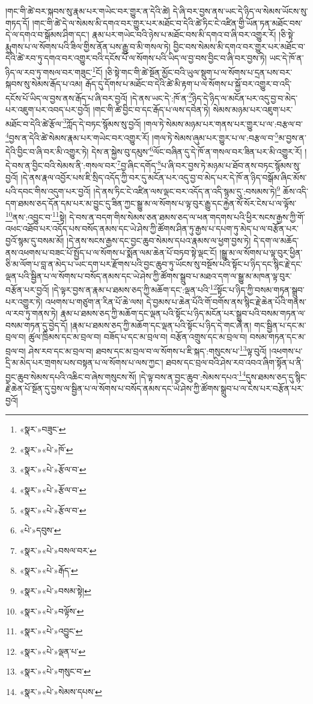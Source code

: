 །གང་གི་ཚེ་བར་སྐབས་སུ་རྣམ་པར་གཡེང་བར་གྱུར་ན་དེའི་ཚེ། དེ་ཞི་བར་བྱས་ནས་ཡང་དེ་ཉིད་ལ་སེམས་ཡོངས་སུ་གཏད་དོ། །གང་གི་ཚེ་དེ་ལ་སེམས་མི་དགའ་བར་གྱུར་པར་མཐོང་བ་དེའི་ཚེ་ཏིང་ངེ་འཛིན་གྱི་ཡོན་ཏན་མཐོང་བས་དེ་ལ་དགའ་བ་སྒོམས་ཤིག་དང་། རྣམ་པར་གཡེང་བའི་ཉེས་པ་མཐོང་བས་མི་དགའ་བ་ཞི་བར་འགྱུར་རོ། །ཅི་སྟེ་རྨུགས་པ་ལ་སོགས་པའི་ཟིལ་གྱིས་ནོན་པས་རྒྱུ་བ་མི་གསལ་ཏེ། བྱིང་བས་སེམས་མི་དགའ་བར་གྱུར་པར་མཐོང་བ་དེའི་ཚེ་རབ་ཏུ་དགའ་བར་འགྱུར་བའི་དངོས་པོ་ལ་སོགས་པའི་ཡིད་ལ་བྱ་བས་བྱིང་བ་ཞི་བར་བྱས་ཏེ། ཡང་དེ་ཁོ་ན་ཉིད་ལ་རབ་ཏུ་གསལ་བར་གཟུང་\footnote{«སྣར་»བཟུང་}ངོ། །ཅི་སྟེ་གང་གི་ཚེ་སྔོན་མྱོང་བའི་ཡུལ་སྡུག་པ་ལ་སོགས་པ་དྲན་པས་བར་སྐབས་སུ་སེམས་རྒོད་པ་འམ། རྒོད་དུ་དོགས་པ་མཐོང་བ་དེའི་ཚེ་མི་རྟག་པ་ལ་སོགས་པ་སྐྱོ་བར་འགྱུར་བ་འདི་དངོས་པོ་ཡིད་ལ་བྱས་ནས་རྒོད་པ་ཞི་བར་བྱའོ། །དེ་ནས་ཡང་དེ་:ཁོ་ན་\footnote{«སྣར་»«པེ་»ཁོ་}ཉིད་དེ་ཉིད་ལ་མངོན་པར་འདུ་བྱ་བ་མེད་པར་འཇུག་པར་འབད་པར་བྱའོ། །གང་གི་ཚེ་བྱིང་བ་དང་རྒོད་པ་ལས་དབེན་ཏེ། སེམས་མཉམ་པར་འཇུག་པར་མཐོང་བ་དེའི་ཚེ་རྩོལ་\footnote{«སྣར་»«པེ་»རྩོལ་བ་}ཀློད་དེ་བཏང་སྙོམས་སུ་བྱའོ། །གལ་ཏེ་སེམས་མཉམ་པར་གནས་པར་གྱུར་པ་ལ་:བརྩལ་བ་\footnote{«སྣར་»«པེ་»རྩོལ་བ་}བྱས་ན་དེའི་ཚེ་སེམས་རྣམ་པར་གཡེང་བར་འགྱུར་རོ། །གལ་ཏེ་སེམས་ཞུམ་པར་གྱུར་པ་ལ་:བརྩལ་བ་\footnote{«སྣར་»«པེ་»རྩོལ་བ་}མ་བྱས་ན་དེའི་བྱིང་བ་ཞི་བར་མི་འགྱུར་ཏེ། དེས་ན་སྐྱེས་བུ་དམུས་\footnote{«པེ་»དབུས་}ལོང་བཞིན་དུ་དེ་ཁོ་ན་གསལ་བར་ཟིན་པར་མི་འགྱུར་རོ། །དེ་བས་ན་བྱིང་བའི་སེམས་ནི་:གསལ་བར་\footnote{«སྣར་»«པེ་»བསལ་བར་}བྱ་ཞིང་དགོད་\footnote{«སྣར་»«པེ་»རྒོད་}པ་ཞི་བར་བྱས་ཏེ་མཉམ་པ་ཐོབ་ནས་བཏང་སྙོམས་སུ་བྱའོ། །དེ་ནས་རྣལ་འབྱོར་པས་ཇི་སྲིད་འདོད་ཀྱི་བར་དུ་མངོན་པར་འདུ་བྱ་བ་མེད་པར་དེ་ཁོ་ན་ཉིད་བསྒོམ་ཞིང་མོས་པའི་དབང་གིས་འདུག་པར་བྱའོ། །དེ་ནས་ཏིང་ངེ་འཛིན་ལས་ལྡང་བར་འདོད་ན་འདི་སྙམ་དུ་:བསམས་ཏེ།\footnote{«སྣར་»«པེ་»བསམ་སྟེ།} ཆོས་འདི་དག་ཐམས་ཅད་དོན་དམ་པར་མ་བྱུང་དུ་ཟིན་ཀྱང་སྒྱུ་མ་ལ་སོགས་པ་ལྟ་བུར་རྒྱུ་དང་རྐྱེན་སོ་སོར་ངེས་པ་ལ་ལྟོས་\footnote{«སྣར་»«པེ་»བལྟོས་}ནས་:འབྱུང་བ་\footnote{«སྣར་»«པེ་»འབྱུང་}སྟེ། དེ་བས་ན་བདག་གིས་སེམས་ཅན་ཐམས་ཅད་ལ་ཕན་གདགས་པའི་ཕྱིར་སངས་རྒྱས་ཀྱི་གོ་འཕང་འཐོབ་པར་འདོད་པས་བསོད་ནམས་དང་ཡེ་ཤེས་ཀྱི་ཚོགས་ཤིན་ཏུ་རྒྱས་པ་དཔག་ཏུ་མེད་པ་ལ་བརྩོན་པར་བྱའོ་སྙམ་དུ་བསམ་མོ། །དེ་ནས་སངས་རྒྱས་དང་བྱང་ཆུབ་སེམས་དཔའ་རྣམས་ལ་ཕྱག་བྱས་ཏེ། དེ་དག་ལ་མཆོད་ནས་འཕགས་པ་བཟང་པོ་སྤྱོད་པ་ལ་སོགས་པ་སྨོན་ལམ་ཆེན་པོ་བཏབ་སྟེ་ལྡང་ངོ། །སྒྱུ་མ་ལ་སོགས་པ་ལྟ་བུར་ཕྱིན་ཅི་མ་ལོག་པ་བླ་ན་མེད་པ་ཡང་དག་པར་རྫོགས་པའི་བྱང་ཆུབ་ཏུ་ཡོངས་སུ་བསྔོས་པའི་སྟོང་པ་ཉིད་དང་སྙིང་རྗེ་དང་ལྡན་པའི་སྦྱིན་པ་ལ་སོགས་པ་བསོད་ནམས་དང་ཡེ་ཤེས་ཀྱི་ཚོགས་སྒྲུབ་པ་མཐའ་དག་ལ་སྒྱུ་མ་མཁན་ལྟ་བུར་བརྩོན་པར་བྱའོ། །དེ་ལྟར་བྱས་ན་རྣམ་པ་ཐམས་ཅད་ཀྱི་མཆོག་དང་:ལྡན་པའི་\footnote{«སྣར་»«པེ་»ལྡན་པ་}སྟོང་པ་ཉིད་ཀྱི་བསམ་གཏན་སྒྲུབ་པར་འགྱུར་ཏེ། འཕགས་པ་གཙུག་ན་རིན་པོ་ཆེ་ལས། དེ་བྱམས་པ་ཆེན་པོའི་གོ་བགོས་ནས་སྙིང་རྗེ་ཆེན་པོའི་གནས་ལ་རབ་ཏུ་གནས་ཏེ། རྣམ་པ་ཐམས་ཅད་ཀྱི་མཆོག་དང་ལྡན་པའི་སྟོང་པ་ཉིད་མངོན་པར་སྒྲུབ་པའི་བསམ་གཏན་ལ་བསམ་གཏན་དུ་བྱེད་དོ། །རྣམ་པ་ཐམས་ཅད་ཀྱི་མཆོག་དང་ལྡན་པའི་སྟོང་པ་ཉིད་དེ་གང་ཞེ་ན། གང་སྦྱིན་པ་དང་མ་བྲལ་བ། ཚུལ་ཁྲིམས་དང་མ་བྲལ་བ། བཟོད་པ་དང་མ་བྲལ་བ། བརྩོན་འགྲུས་དང་མ་བྲལ་བ། བསམ་གཏན་དང་མ་བྲལ་བ། ཤེས་རབ་དང་མ་བྲལ་བ། ཐབས་དང་མ་བྲལ་བ་ལ་སོགས་པ་ཇི་སྐད་:གསུངས་པ་\footnote{«སྣར་»«པེ་»གསུང་བ་}ལྟ་བུའོ། །འཕགས་པ་དྲི་མ་མེད་པར་གྲགས་པས་བསྟན་པ་ལ་སོགས་པ་ལས་ཀྱང་། ཐབས་དང་བྲལ་བའི་ཤེས་རབ་འབའ་ཞིག་སྟོན་པ་ནི་བྱང་ཆུབ་སེམས་དཔའི་འཆིང་བ་ཞེས་གསུངས་སོ། །དེ་ལྟ་བས་ན་བྱང་ཆུབ་:སེམས་དཔའ་\footnote{«སྣར་»«པེ་»སེམས་དཔས་}དུས་ཐམས་ཅད་དུ་སྙིང་རྗེ་ཆེན་པོ་སྔོན་དུ་བྱས་ལ་སྦྱིན་པ་ལ་སོགས་པ་བསོད་ནམས་དང་ཡེ་ཤེས་ཀྱི་ཚོགས་སྒྲུབ་པ་ལ་ངེས་པར་བརྩོན་པར་བྱའོ། 